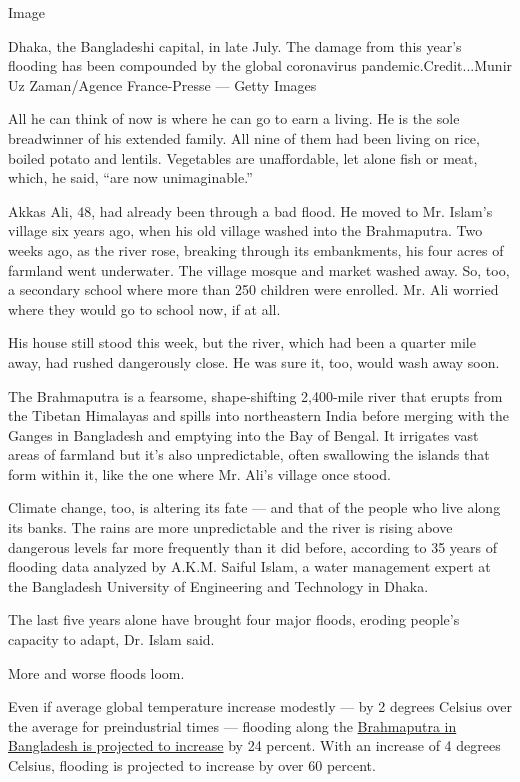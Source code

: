 Image

Dhaka, the Bangladeshi capital, in late July. The damage from this
year's flooding has been compounded by the global coronavirus
pandemic.Credit...Munir Uz Zaman/Agence France-Presse --- Getty Images

All he can think of now is where he can go to earn a living. He is the
sole breadwinner of his extended family. All nine of them had been
living on rice, boiled potato and lentils. Vegetables are unaffordable,
let alone fish or meat, which, he said, ``are now unimaginable.''

Akkas Ali, 48, had already been through a bad flood. He moved to Mr.
Islam's village six years ago, when his old village washed into the
Brahmaputra. Two weeks ago, as the river rose, breaking through its
embankments, his four acres of farmland went underwater. The village
mosque and market washed away. So, too, a secondary school where more
than 250 children were enrolled. Mr. Ali worried where they would go to
school now, if at all.

His house still stood this week, but the river, which had been a quarter
mile away, had rushed dangerously close. He was sure it, too, would wash
away soon.

The Brahmaputra is a fearsome, shape-shifting 2,400-mile river that
erupts from the Tibetan Himalayas and spills into northeastern India
before merging with the Ganges in Bangladesh and emptying into the Bay
of Bengal. It irrigates vast areas of farmland but it's also
unpredictable, often swallowing the islands that form within it, like
the one where Mr. Ali's village once stood.

Climate change, too, is altering its fate --- and that of the people who
live along its banks. The rains are more unpredictable and the river is
rising above dangerous levels far more frequently than it did before,
according to 35 years of flooding data analyzed by A.K.M. Saiful Islam,
a water management expert at the Bangladesh University of Engineering
and Technology in Dhaka.

The last five years alone have brought four major floods, eroding
people's capacity to adapt, Dr. Islam said.

More and worse floods loom.

Even if average global temperature increase modestly --- by 2 degrees
Celsius over the average for preindustrial times --- flooding along the
\href{https://ascelibrary.org/doi/abs/10.1061/\%28ASCE\%29HE.1943-5584.0001705}{Brahmaputra
in Bangladesh is projected to increase} by 24 percent. With an increase
of 4 degrees Celsius, flooding is projected to increase by over 60
percent.

